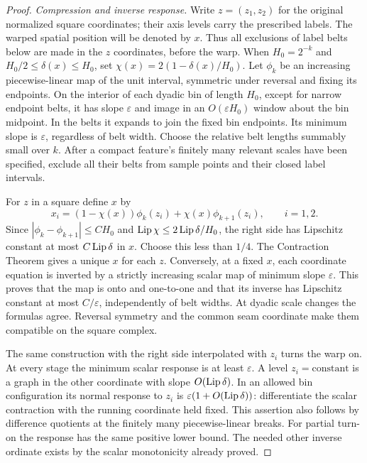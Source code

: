 \begin{proof}
\emph{Compression and inverse response.}
Write $z=(z_1,z_2)$ for the original normalized square coordinates;
their axis levels carry the prescribed labels.  The warped spatial
position will be denoted by $x$.  Thus all exclusions of label belts
below are made in the $z$ coordinates, before the warp.
When $H_0=2^{-k}$ and $H_0/2\le\delta(x)\le H_0$, set
$\chi(x)=2(1-\delta(x)/H_0)$.  Let $\phi_k$ be an increasing
piecewise-linear map of the unit interval, symmetric under reversal
and fixing its endpoints.  On the interior of each dyadic bin of
length $H_0$, except for narrow endpoint belts, it has slope
$\varepsilon$ and image in an $O(\varepsilon H_0)$ window about the
bin midpoint.  In the belts it expands to join the fixed bin
endpoints.  Its minimum slope is $\varepsilon$, regardless of belt
width.  Choose the relative belt lengths summably small over $k$.
After a compact feature's finitely many relevant scales have been
specified, exclude all their belts from sample points and their
closed label intervals.

For $z$ in a square define $x$ by
\begin{equation}
 x_i=(1-\chi(x))\phi_k(z_i)+\chi(x)\phi_{k+1}(z_i),
 \qquad i=1,2.
 \label{ms:warp}
\end{equation}
Since $|\phi_k-\phi_{k+1}|\le C H_0$ and
$\operatorname{Lip}\chi\le 2\operatorname{Lip}\delta/H_0$, the right side has Lipschitz
constant at most $C\operatorname{Lip}\delta$ in $x$.  Choose this less than $1/4$.
The Contraction Theorem gives a unique $x$ for each $z$.  Conversely,
at a fixed $x$, each coordinate equation is inverted by a strictly
increasing scalar map of minimum slope $\varepsilon$.  This proves
that the map is onto and one-to-one and that its inverse has Lipschitz
constant at most $C/\varepsilon$, independently of belt widths.
At dyadic scale changes the formulas agree.  Reversal symmetry and
the common seam coordinate make them compatible on the square
complex.

The same construction with the right side interpolated with $z_i$
turns the warp on.  At every stage the minimum scalar response is
at least $\varepsilon$.  A level $z_i=\text{constant}$ is a graph in
the other coordinate with slope $O(\operatorname{Lip}\delta)$.  In an allowed bin
configuration its normal response to $z_i$ is
$\varepsilon(1+O(\operatorname{Lip}\delta))$: differentiate the scalar contraction
with the running coordinate held fixed.  This assertion also follows
by difference quotients at the finitely many piecewise-linear breaks.
For partial turn-on the response has the same positive lower bound.
The needed other inverse ordinate exists by the scalar monotonicity
already proved.


\end{proof}
